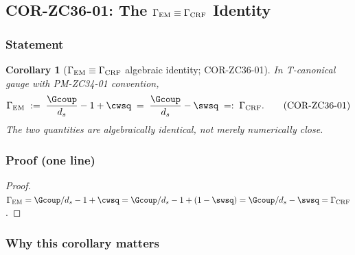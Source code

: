 \documentclass[12pt, a4paper]{article}
\newtheorem{corollary}{Corollary}[section]
\begin{document}
\subsection{COR-ZC36-01: The $\Gamma_{\rm EM} \equiv \Gamma_{\rm CRF}$
        Identity}
\label{sec:cor-zc36-01}

\subsubsection{Statement}

\begin{corollary}[$\Gamma_{\rm EM} \equiv \Gamma_{\rm CRF}$
                  algebraic identity; COR-ZC36-01]
\label{cor:zc36-01}
In T-canonical gauge with PM-ZC34-01 convention,
\begin{equation}
  \Gamma_{\rm EM}
  \;:=\; \frac{\Gcoup}{d_s} - 1 + \cwsq
  \;=\; \frac{\Gcoup}{d_s} - \swsq
  \;=:\; \Gamma_{\rm CRF}.
  \tag{COR-ZC36-01}\label{eq:cor-zc36-01}
\end{equation}
The two quantities are \emph{algebraically identical}, not
merely numerically close.
\end{corollary}

\subsubsection{Proof (one line)}

\begin{proof}
$\Gamma_{\rm EM} = \Gcoup/d_s - 1 + \cwsq
= \Gcoup/d_s - 1 + (1 - \swsq)
= \Gcoup/d_s - \swsq = \Gamma_{\rm CRF}$.
\end{proof}

\subsubsection{Why this corollary matters}
\end{document}
